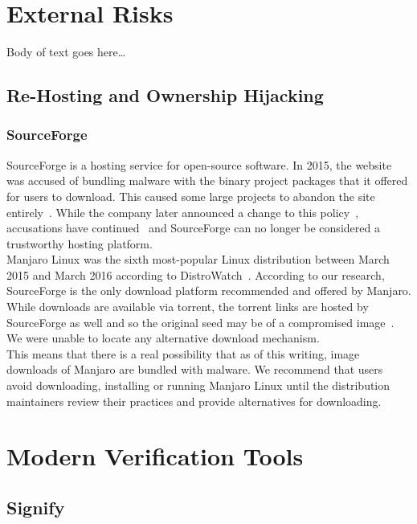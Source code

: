 \documentclass[conference]{IEEEtran}
\begin{document}
\section{External Risks}

Body of text goes here\ldots

\subsection{Re-Hosting and Ownership Hijacking}

\subsubsection{SourceForge}

SourceForge is a hosting service for open-source software. In 2015, the
website was accused of bundling malware with the binary project packages
that it offered for users to download. This caused some large projects to
abandon the site entirely~\cite{GIMPSourceForge}. While the company later
announced a change to this policy~\cite{SourceForgePolicy}, accusations
have continued~\cite{NmapSourceForge} and SourceForge can no longer be considered
a trustworthy hosting platform.\\
\indent Manjaro Linux was the sixth most-popular Linux distribution between March 2015
and March 2016 according to DistroWatch~\cite{DistroWatch}. According to our research,
SourceForge is the only download platform recommended and offered by
Manjaro. While downloads are available via torrent, the torrent
links are hosted by SourceForge as well and so the original seed may be of a compromised
image~\cite{ManjaroDownload}. We were unable to locate any alternative download mechanism.\\
\indent This means that there is a real possibility that as of this writing, image downloads
of Manjaro are bundled with malware. We recommend that users avoid downloading, installing
or running Manjaro Linux until the distribution maintainers review their practices and
provide alternatives for downloading.

\section{Modern Verification Tools}

\subsection{Signify}
\end{document}
